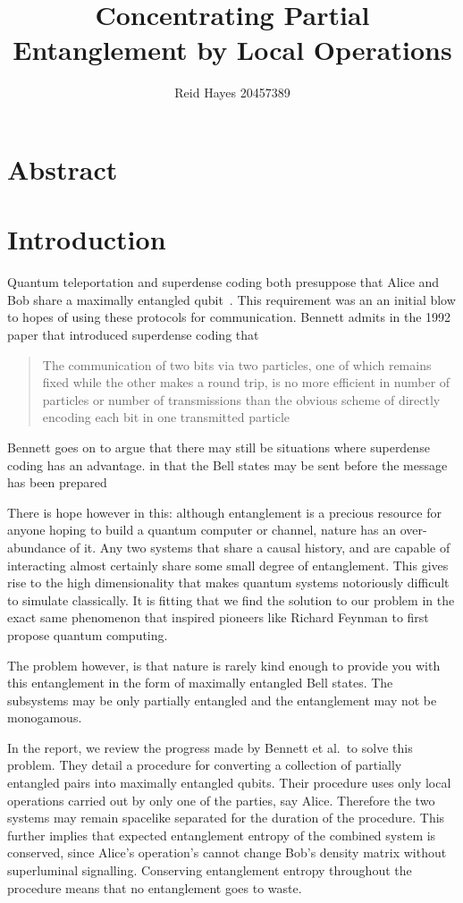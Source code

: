 \documentclass[12pt,letterpaper]{article}
\author{Reid Hayes 20457389}
\title{Concentrating Partial Entanglement by Local Operations}
\begin{document}
\maketitle
\section{Abstract}
\section{Introduction}
Quantum teleportation and superdense coding both presuppose that Alice and Bob share a maximally entangled qubit~\cite{barrett2004teleportation, bennett1992superdense}. 
This requirement was an an initial blow to hopes of using these protocols for communication.
Bennett admits in the 1992 paper that introduced superdense coding that

\hyphenblockcquote{UKenglish}{bennett1992superdense}{
The communication of two bits via two particles, one of which remains fixed while the other makes a round trip, is no more efficient in number of particles or number of transmissions than the obvious scheme of directly encoding each bit in one transmitted particle
}

Bennett goes on to argue that there may still be situations where superdense coding has an advantage. in that the Bell states may be sent before the message has been prepared

There is hope however in this: although entanglement is a precious resource for anyone hoping to build a quantum computer or channel, nature has an over-abundance of it. 
Any two systems that share a causal history, and are capable of interacting almost certainly share some small degree of entanglement.
This gives rise to the high dimensionality that makes quantum systems notoriously difficult to simulate classically.
It is fitting that we find the solution to our problem in the exact same phenomenon that inspired pioneers like Richard Feynman to first propose quantum computing.

The problem however, is that nature is rarely kind enough to provide you with this entanglement in the form of maximally entangled Bell states.
The subsystems may be only partially entangled and the entanglement may not be monogamous.

In the report, we review the progress made by Bennett et al.\ to solve this problem.
They detail a procedure for converting a collection of partially entangled pairs into maximally entangled qubits.
Their procedure uses only local operations carried out by only one of the parties, say Alice. Therefore the two systems may remain spacelike separated for the duration of the procedure.
This further implies that expected entanglement entropy of the combined system is conserved, since Alice's operation's cannot change Bob's density matrix without superluminal signalling. Conserving entanglement entropy throughout the procedure means that no entanglement goes to waste.
\end{document}
